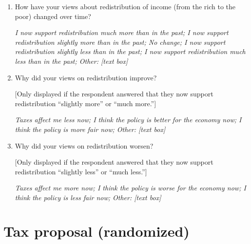 \documentclass[11pt, headsepline]{article}
\newcommand{\blue}[1]{\textcolor{blue}{#1}}
\begin{document}
\begin{enumerate}[resume]
    \blue{\cite{stantcheva2021understanding}: For these different groups, please tell me if you think that they are paying their fair share in federal taxes, paying too much, or paying too little? \textit{High income households; Middle-class households}''}

    \item How have your views about redistribution of income (from the rich to the poor) changed over time? 

    \textit{I now support redistribution much more than in the past; I now support redistribution slightly more than in the past; No change; I now support redistribution slightly less than in the past; I now support redistribution much less than in the past; Other: [text box]}

    \item Why did your views on redistribution improve? 
    
    [Only displayed if the respondent answered that they now support redistribution ``slightly more'' or ``much more.'']

    \textit{Taxes affect me less now; I think the policy is better for the economy now; I think the policy is more fair now; Other: [text box]}

    \item Why did your views on redistribution worsen? 
    
    [Only displayed if the respondent answered that they now support redistribution ``slightly less'' or ``much less.'']

    \textit{Taxes affect me more now; I think the policy is worse for the economy now; I think the policy is less fair now; Other: [text box]}
    
\end{enumerate}


\section*{Tax proposal (randomized)}
\end{document}
